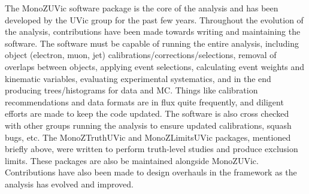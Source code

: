 The MonoZUVic software package is the core of the analysis and has been developed by the UVic group for the past few years. Throughout the evolution of the analysis, contributions have been made towards writing and maintaining the software. The software must be capable of running the entire analysis, including object (electron, muon, jet) calibrations/corrections/selections, removal of overlaps between objects, applying event selections, calculating event weights and kinematic variables, evaluating experimental systematics, and in the end producing trees/histograms for data and MC. Things like calibration recommendations and data formats are in flux quite frequently, and diligent efforts are made to keep the code updated. The software is also cross checked with other groups running the analysis to ensure updated calibrations, squash bugs, etc. The MonoZTruthUVic and MonoZLimitsUVic packages, mentioned briefly above, were written to perform truth-level studies and produce exclusion limits. These packages are also be maintained alongside MonoZUVic. Contributions have also been made to design overhauls in the framework as the analysis has evolved and improved.



